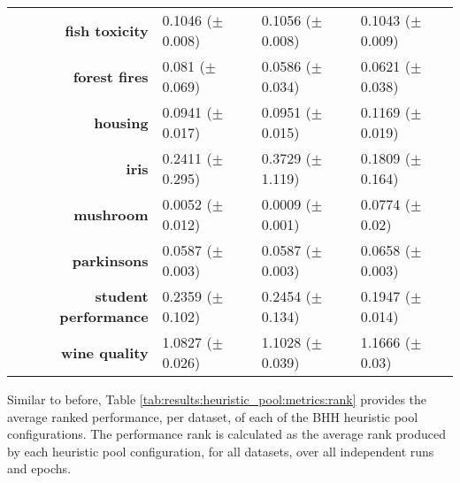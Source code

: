 \begin{table}[htb]
{\begin{tabular}{r|lll}
                  \textbf{fish toxicity}       & \cellcolor[rgb]{ 1,  .922,  .518}0.1046 ($\pm$0.008)            & \cellcolor[rgb]{ .973,  .412,  .42}0.1056 ($\pm$0.008)  & \cellcolor[rgb]{ .388,  .745,  .482}0.1043 ($\pm$0.009) \\
                  \textbf{forest fires}        & \cellcolor[rgb]{ .973,  .412,  .42}0.081 ($\pm$0.069)           & \cellcolor[rgb]{ .388,  .745,  .482}0.0586 ($\pm$0.034) & \cellcolor[rgb]{ 1,  .922,  .518}0.0621 ($\pm$0.038)    \\
                  \textbf{housing}             & \cellcolor[rgb]{ .388,  .745,  .482}0.0941 ($\pm$0.017)         & \cellcolor[rgb]{ 1,  .922,  .518}0.0951 ($\pm$0.015)    & \cellcolor[rgb]{ .973,  .412,  .42}0.1169 ($\pm$0.019)  \\
                  \textbf{iris}                & \cellcolor[rgb]{ 1,  .922,  .518}0.2411 ($\pm$0.295)            & \cellcolor[rgb]{ .973,  .412,  .42}0.3729 ($\pm$1.119)  & \cellcolor[rgb]{ .388,  .745,  .482}0.1809 ($\pm$0.164) \\
                  \textbf{mushroom}            & \cellcolor[rgb]{ 1,  .922,  .518}0.0052 ($\pm$0.012)            & \cellcolor[rgb]{ .388,  .745,  .482}0.0009 ($\pm$0.001) & \cellcolor[rgb]{ .973,  .412,  .42}0.0774 ($\pm$0.02)   \\
                  \textbf{parkinsons}          & \cellcolor[rgb]{ 1,  .922,  .518}0.0587 ($\pm$0.003)            & \cellcolor[rgb]{ .388,  .745,  .482}0.0587 ($\pm$0.003) & \cellcolor[rgb]{ .973,  .412,  .42}0.0658 ($\pm$0.003)  \\
                  \textbf{student performance} & \cellcolor[rgb]{ 1,  .922,  .518}0.2359 ($\pm$0.102)            & \cellcolor[rgb]{ .973,  .412,  .42}0.2454 ($\pm$0.134)  & \cellcolor[rgb]{ .388,  .745,  .482}0.1947 ($\pm$0.014) \\
                  \textbf{wine quality}        & \cellcolor[rgb]{ .388,  .745,  .482}1.0827 ($\pm$0.026)         & \cellcolor[rgb]{ 1,  .922,  .518}1.1028 ($\pm$0.039)    & \cellcolor[rgb]{ .973,  .412,  .42}1.1666 ($\pm$0.03)   \\
            \end{tabular}%

      }
\end{table}%

Similar to before, Table \ref{tab:results:heuristic_pool:metrics:rank} provides the average ranked performance, per dataset, of each of the \acs{BHH} heuristic pool configurations. The performance rank is calculated as the average rank produced by each heuristic pool configuration, for all datasets, over all independent runs and epochs.

